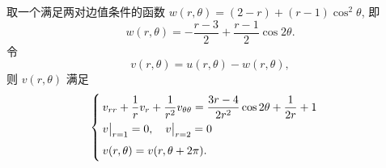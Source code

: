 \begin{solution}
取一个满足两对边值条件的函数 $w(r,\theta) = (2 - r) + (r-1)\cos^2 \theta$, 即
\begin{equation}\label{eq:w}
	w(r,\theta) = -\frac{r-3}{2} + \frac{r-1}{2}\cos 2\theta.
\end{equation}
令
\begin{equation}\label{eq:uvw}
	v(r,\theta) = u(r,\theta) - w(r,\theta),
\end{equation}
则 $v(r,\theta)$ 满足
\begin{equation}\label{eq:v_r_theta}
	\begin{cases}
		v_{rr} + \dfrac 1r v_r + \dfrac{1}{r^2} v_{\theta \theta} = \dfrac{3r-4}{2r^2} \cos 2\theta + \dfrac{1}{2r} + 1 \\[5pt]
		\eval[1]{v}_{r = 1} = 0,\quad \eval[1]{v}_{r = 2} = 0 \\[5pt]
		v(r,\theta) = v(r,\theta + 2\pi).
	\end{cases}
\end{equation}


\end{solution}
